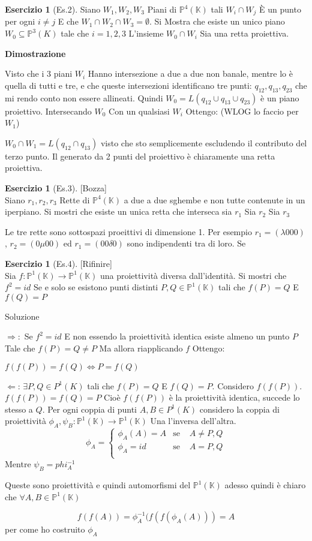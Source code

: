 \documentclass[a4paper,twoside]{article}
\newcommand{\Pro}{\mathbb{P}}
\newcommand{\K}{\mathbb{K}}
\theoremstyle{definition}
\newtheorem{ex}[theorem]{Esercizio}
\numberwithin{theorem}{section}
\begin{document}
\begin{ex}[Es.2]
Siano $W_1,W_2,W_3$ Piani di $\Pro^4(\K)$ tali $W_i\cap W_j$ È un punto per ogni $i\neq j$ E che $W_1\cap W_2\cap W_3 =\emptyset$. 
Si Mostra che esiste un unico piano $W_0\subseteq \Pro^3(K)$ tale che $i=1,2,3$ L’insieme $W_0\cap W_i$ Sia una retta proiettiva.

\textbf{Dimostrazione}

Visto che i 3 piani $W_i$ Hanno intersezione a due a due non banale, mentre lo è quella di tutti e tre, e che queste intersezioni identificano tre punti: $q_{12},q_{13},q_{23}$ che mi rendo conto non essere allineati.
Quindi $W_0=L(q_{12}\cup q_{13}\cup q_{23})$ è un piano proiettivo. Intersecando $W_0$ Con un qualsiasi $W_i$ Ottengo: (WLOG lo faccio per $W_1$)

$W_0\cap W_1= L(q_{12}\cap q_{13})$ visto che sto semplicemente escludendo il contributo del terzo punto.
Il generato da 2 punti del proiettivo è chiaramente una retta proiettiva.

\end{ex}
\begin{ex}[Es.3]
[Bozza]\\
Siano $r_1,r_2,r_3$ Rette di $\Pro^4(\K)$ a due a due sghembe e non tutte contenute in un iperpiano. Si mostri che esiste un unica retta che interseca sia $r_1$ Sia $r_2$ Sia $r_3$

Le tre rette sono sottospazi proeittivi di dimensione 1. Per esempio $r_1=(\lambda 0 0 0)$, $r_2=(0 \mu 0 0)$ ed $r_1=(0 0 \delta 0)$ sono indipendenti tra di loro. Se

\end{ex}
\begin{ex}[Es.4]
[Rifinire]\\

Sia $f:\Pro^1(\K)\to \Pro^1(\K)$ una proiettività diversa dall’identità. Si mostri che $f^2=id$ Se e solo se esistono punti distinti $P,Q\in \Pro^1(\K)$ tali che $f(P)=Q$ E $f(Q)=P$

Soluzione

$\Rightarrow:$ Se $f^2=id$ E non essendo la proiettività identica esiste almeno un punto $P$ Tale che $f(P)=Q\neq P$ Ma allora riapplicando $f$ Ottengo:

 $f(f(P))=f(Q)\Leftrightarrow P=f(Q)$

$\Leftarrow$: $\exists P,Q\in P^1(K)$ tali che $f(P)=Q$ E $f(Q)=P$.
Considero $f(f(P))$.
$f(f(P))=f(Q)=P$ Cioè $f(f(P))$ è la proiettività identica, succede lo stesso a $Q$.
Per ogni coppia di punti $A,B\in P^1(K)$ considero la coppia di proiettività $\phi_A,\psi_B: \Pro^1(\K)\to \Pro^1(\K)$
Una l’inversa dell’altra.
$$\phi_A=\left\{\begin{array}{ccl} \phi_A(A)=A & \text{se } & A\neq P,Q \\
  \phi_A=id & \text{se} & A=P,Q  \\ 
\end{array}$$
Mentre $\psi_B=phi_A^{-1}$

Queste sono proiettività e quindi automorfismi del $\Pro^1(\K)$ adesso quindi è chiaro che $\forall A,B\in \Pro^1(\K)$ 

$$f(f(A))=\phi_A^{-1}(f(f(\phi_A(A)))=A$$ per come ho costruito $\phi_A$

\end{ex}
\newpage
\end{document}
